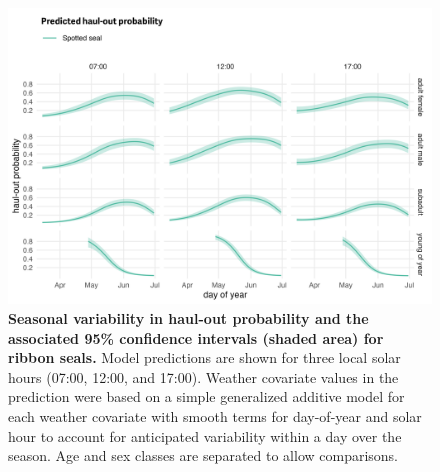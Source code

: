 \documentclass[fleqn,10pt,lineno]{wlpeerj} %
\begin{document}
\begin{figure}
\includegraphics[width=1\linewidth]{../figures/Figure-014} \caption{\textbf{Seasonal variability in haul-out probability and the associated 95\% confidence intervals (shaded area) for ribbon seals.} \linebreak Model predictions are shown for three local solar hours (07:00, 12:00, and 17:00). Weather covariate values in the prediction were based on a simple generalized additive model for each weather covariate with smooth terms for day-of-year and solar hour to account for anticipated variability within a day over the season. Age and sex classes are separated to allow comparisons.}\label{fig:ribbonPredSE}
\end{figure}
\end{document}
